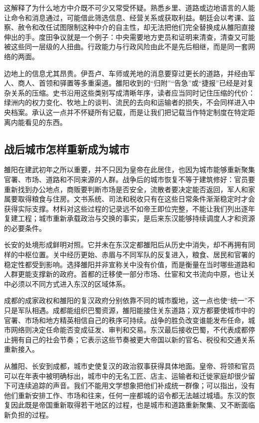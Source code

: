 这解释了为什么地方中介既不可少又常受怀疑。熟悉乡里、道路或边地语言的人能让命令和消息通过，可能借此筛选信息、经营关系或获取利益。朝廷会以考课、监察、赦令和改任试图限制这种中介的自主性，却无法把他们完全替换成从雒阳直接伸出的手。度田争议就是一个例子：中央需要地方吏员和证明来清查，清查又可能被这些同一层级的人扭曲。行政能力与行政风险由此不是先后相继，而是同一套网络的两面。

边地上的信息尤其昂贵。伊吾卢、车师或羌地的消息要穿过更长的道路，并经由军人、商人、首领和驿置等多重渠道。雒阳收到的“归附”“告急”或“捷报”已经是对复杂关系的压缩。史书沿用这些类别写成清晰年序，读者应当同时记住压缩的代价：绿洲内的权力变化、牧地上的谈判、流民的去向和运输者的损失，不会同样进入中央档案。承认这一点并不怀疑所有记载，而是让我们把记载当作特定制度在特定距离内能看见的东西。

\subsection{战后城市怎样重新成为城市}

雒阳在建武初年之所以重要，并不只因为皇帝在此居住，也因为城市能够重新聚集官署、市场、道路和不同来源的人群。战争后的城市恢复不等于建筑修好：官员要重新找到办公地点，商贩要判断市场是否安全，流散者要决定能否返回，军人和家属要取得粮食与住房。文书系统、司法和税收只有在这些日常条件渐渐稳定时才会获得实际支撑。材料对这些过程的记录远不如帝王即位完整，不能让我们列出逐年复建工程；城市重新承载政治与交换的事实，是后来东汉能够持续调度人才和资源的必要条件。

长安的处境形成鲜明对照。它并未在东汉定都雒阳后从历史中消失，却不再拥有同样的中枢位置。关中经历更始、赤眉与不同军队的反复进入，粮食、居民和官署的稳定性都受到影响。选择雒阳并非宣称关中没有价值，而是衡量在当时哪些道路和人群更能支撑新的政府。首都的迁移使一部分市场、仕宦和文书流向中原，也让关中必须以不同方式进入东汉的区域体系。

成都的成家政权和雒阳的复汉政府分别依靠不同的城市腹地，这一点也使“统一”不只是军队相遇。成都能组织巴蜀资源，雒阳能接住关东道路；双方都要使城市中的官署、市场和地方精英相信自己的秩序可持续。战争的胜负改变谁能发布任命，城市网络则决定任命能否变成征发、审判和交易。东汉最后接收巴蜀，不代表成都停止拥有自己的社会节奏；它表示这些节奏被更大帝国以新的官名、税役和交通关系重新接入。

从雒阳、长安到成都，城市史使复汉的政治叙事获得具体地面。皇帝、将领和官员可以在年表中被明确标出，城市中的无名工匠、店主、运输者和迁徙家庭却很少留下可连续追踪的声音。我们不能用文学想象把他们补成统一群像；可以指出，没有他们重新安排工作、市场和往来，任何一座都城的诏令都无法越过城墙。东汉的恢复因此既是帝国重新取得若干地区的过程，也是城市和道路重新聚集、又不断面临新负担的过程。

